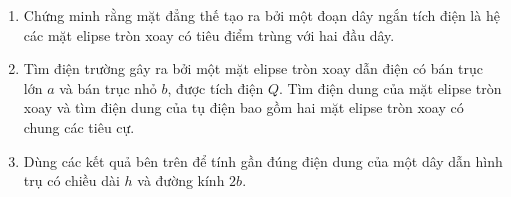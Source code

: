   \begin{vd}
  \begin{enumerate}[1)]
    \item Chứng minh rằng mặt đẳng thế tạo ra bởi một đoạn dây ngắn tích điện là hệ các mặt elipse tròn xoay có tiêu điểm trùng với hai đầu dây.
  \item Tìm điện trường gây ra bởi một mặt elipse tròn xoay dẫn điện có bán trục lớn $a$ và bán trục nhỏ $b$, được tích điện $Q$. Tìm điện dung của mặt elipse tròn xoay và tìm điện dung của tụ điện bao gồm hai mặt elipse tròn xoay có chung các tiêu cự.
  \item Dùng các kết quả bên trên để tính gần đúng điện dung của một dây dẫn hình trụ có chiều dài $h$ và đường kính $2b$. 
  \end{enumerate}
\end{vd}

